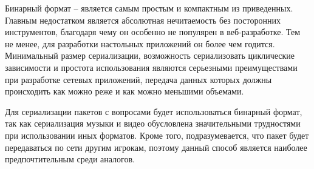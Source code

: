 Бинарный формат -- является самым простым и компактным из приведенных. Главным недостатком является абсолютная нечитаемость без посторонних инструментов, благодаря чему он особенно
не популярен в веб-разработке. Тем не менее, для разработки настольных приложений он более чем годится. Минимальный размер сериализации, возможность сериализовать циклические зависимости 
и простота использования являются серьезными преимуществами при разработке сетевых приложений, передача данных которых должны происходить как можно реже и как можно меньшими объемами.

Для сериализации пакетов с вопросами будет использоваться бинарный формат, так как сериализация музыки и видео обусловлена значительными трудностями при использовании иных форматов.
Кроме того, подразумевается, что пакет будет передаваться по сети другим игрокам, поэтому данный способ является наиболее предпочтительным среди аналогов.